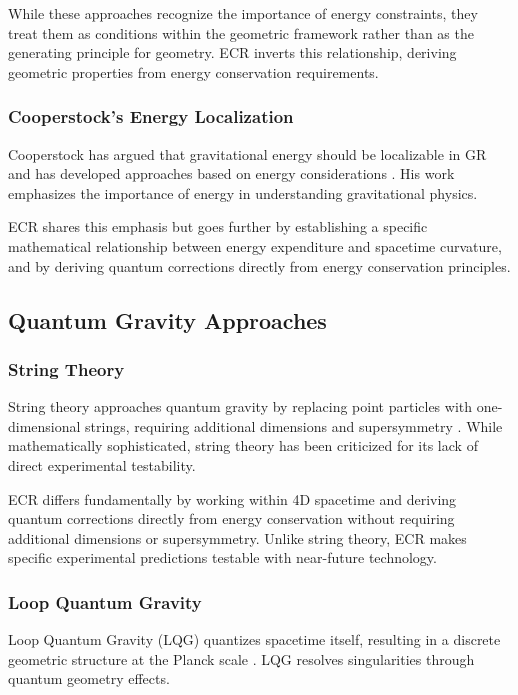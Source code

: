 \documentclass[11pt,a4paper]{article}
\begin{document}
While these approaches recognize the importance of energy constraints, they treat them as conditions within the geometric framework rather than as the generating principle for geometry. ECR inverts this relationship, deriving geometric properties from energy conservation requirements.

\subsubsection{Cooperstock's Energy Localization}

Cooperstock has argued that gravitational energy should be localizable in GR and has developed approaches based on energy considerations \cite{cooperstock1996}. His work emphasizes the importance of energy in understanding gravitational physics.

ECR shares this emphasis but goes further by establishing a specific mathematical relationship between energy expenditure and spacetime curvature, and by deriving quantum corrections directly from energy conservation principles.

\subsection{Quantum Gravity Approaches}

\subsubsection{String Theory}

String theory approaches quantum gravity by replacing point particles with one-dimensional strings, requiring additional dimensions and supersymmetry \cite{polchinski1998}. While mathematically sophisticated, string theory has been criticized for its lack of direct experimental testability.

ECR differs fundamentally by working within 4D spacetime and deriving quantum corrections directly from energy conservation without requiring additional dimensions or supersymmetry. Unlike string theory, ECR makes specific experimental predictions testable with near-future technology.

\subsubsection{Loop Quantum Gravity}

Loop Quantum Gravity (LQG) quantizes spacetime itself, resulting in a discrete geometric structure at the Planck scale \cite{rovelli2004}. LQG resolves singularities through quantum geometry effects.
\end{document}
